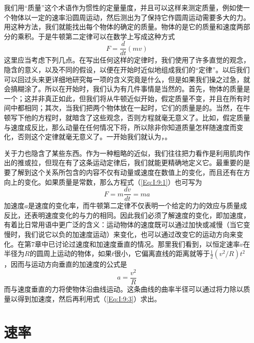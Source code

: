 我们用“质量”这个术语作为惯性的定量量度，并且可以这样来测定质量，例如使一个物体以一定的速率沿圆周运动，然后测出为了保持它作圆周运动需要多大的力。用这种方法，我们就能找出每个物体的确定的质量。物体的是它的质量和速度两部分的乘积。于是牛顿第二定律可以在数学上写成这种方式
\begin{equation}
    \label{Eq:I:9:1}
    F=\frac{d}{dt}(mv)
\end{equation}
这里应当考虑下列几点。在写出任何这样的定律时，我们使用了许多直觉的观念，隐含的意义，以及不同的假设，以便在开始时近似地组成我们的“定律”。以后我们可以回过头来更详细地研究每一项的含义究竟是什么，但是如果我们操之过急，就会搞糊涂了。所以在开始时，我们认为有几件事情是当然的。首先，物体的质量是一个；这并非真正如此，但我们将从牛顿近似开始，假定质量不变，并且在所有时间中都相同；其次，当我们把两个物体放在一起时，它们的质量是的。当然，在牛顿写下他的方程时，就暗含了这些观念，否则方程就毫无意义了。比如，假定质量与速度成反比，那么动量在任何情况下将，所以除非你知道质量怎样随速度而变化，否则这个定律就毫无意义了。一开始我们就认为，。

关于力也隐含了某些东西。作为一种粗略的近似，我们往往把力看作是利用肌肉作出的推或拉，但现在有了这条运动定律后，我们就能更精确地定义它。最重要的是要了解到这个关系所包含的内容不仅有动量或速度在数值上的变化，而且还有在方向上的变化。如果质量是常数，那么方程式（\ref{Eq:I:9:1}）也可写为
\begin{equation}
    \label{Eq:I:9:2}
    F=m\frac{dv}{dt}=ma
\end{equation}
加速度$a$是速度的变化率，而牛顿第二定律不仅表明一个给定的力的效应与质量成反比，还表明速度变化的与力的相同。因此我们必须了解速度的变化，即加速度，有着比日常用语中更广泛的含义：运动物体的速度既可以通过加快或减慢（当它变慢时，我们说它以负的加速度运动）来变化，也可以通过改变它的运动方向来变化。在第7章中已讨论过速度和加速度垂直的情况。那里我们看到，以恒定速率$v$在半径为$R$的圆周上运动的物体，如果$t$很小，它偏离直线的距离就等于$\frac{1}{2}(v^2/R)t^2$，因而与运动方向垂直的加速度的公式是
\begin{equation}
    \label{Eq:I:9:3}
    a=\frac{v^2}{R}
\end{equation}
而与速度垂直的力将使物体沿曲线运动。这条曲线的曲率半径可以通过将力除以质量以得到加速度，然后再利用式（\ref{Eq:I:9:3}）求出。

\section{速率}

